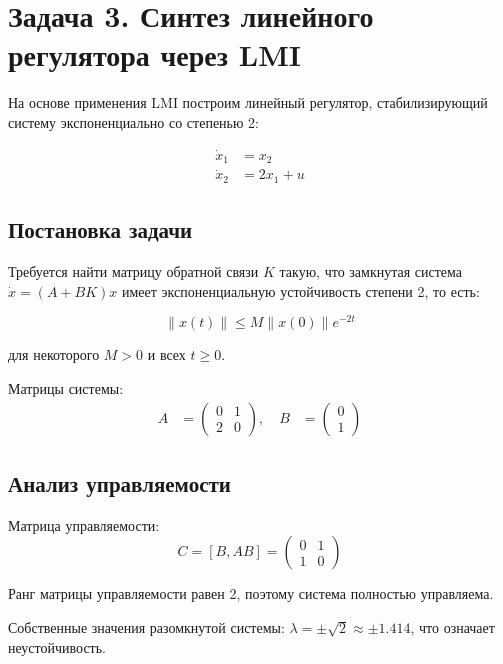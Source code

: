 \section{Задача 3. Синтез линейного регулятора через LMI}

На основе применения LMI построим линейный регулятор, стабилизирующий систему экспоненциально со степенью 2:

\begin{align}
\dot{x}_1 &= x_2 \\
\dot{x}_2 &= 2x_1 + u
\end{align}

\subsection{Постановка задачи}

Требуется найти матрицу обратной связи $K$ такую, что замкнутая система $\dot{x} = (A + BK)x$ имеет экспоненциальную устойчивость степени 2, то есть:

\begin{equation}
\|x(t)\| \leq M\|x(0)\|e^{-2t}
\end{equation}

для некоторого $M > 0$ и всех $t \geq 0$.

Матрицы системы:
\begin{align}
A &= \begin{pmatrix} 0 & 1 \\ 2 & 0 \end{pmatrix}, \quad
B &= \begin{pmatrix} 0 \\ 1 \end{pmatrix}
\end{align}

\subsection{Анализ управляемости}

Матрица управляемости:
\begin{equation}
C = [B, AB] = \begin{pmatrix} 0 & 1 \\ 1 & 0 \end{pmatrix}
\end{equation}

Ранг матрицы управляемости равен 2, поэтому система полностью управляема.

Собственные значения разомкнутой системы: $\lambda = \pm\sqrt{2} \approx \pm 1.414$, что означает неустойчивость.

